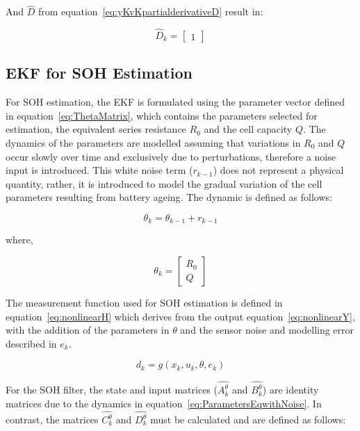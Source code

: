 And $\hat{D}$ from equation~\eqref{eq:yKvKpartialderivativeD} result in:

\begin{equation}
    \hat{D}_k = \begin{bmatrix}
    1
    \label{Dmatrix}
    \end{bmatrix}
\end{equation}

\subsection{EKF for SOH Estimation}\label{SOHEKF}
For \acs{SOH} estimation, the \acs{EKF} is formulated using the parameter vector defined in equation~\ref{eq:ThetaMatrix}, 
which contains the parameters selected for estimation, the equivalent series resistance $R_0$ and the cell capacity $Q$.
The dynamics of the parameters are modelled assuming that variations in $R_0$ and $Q$ occur slowly over time and exclusively due to 
perturbations, therefore a noise input is introduced. 
This white noise term ($r_{k-1}$) does not represent a physical quantity, rather, it is introduced to model the gradual 
variation of the cell parameters 
resulting from battery ageing. The dynamic is defined as follows:

\begin{equation}
    \theta_k = \theta_{k-1} + r_{k-1}
    \label{eq:ParametersEqwithNoise}
\end{equation}

where,

\begin{equation}
    \theta_k = \begin{bmatrix}
    R_0 \\
    Q
    \label{eq:ThetaMatrix}
    \end{bmatrix}
\end{equation}

The measurement function used for \acs{SOH} estimation is defined in equation~\ref{eq:nonlinearH} which derives from 
the output equation~\ref{eq:nonlinearY}, with the addition of the parameters in $\theta$ and the sensor noise and modelling error 
described in $e_k$.

\begin{equation}
    d_k = g(x_k, u_k, \theta, e_k)
    \label{eq:nonlinearH}
\end{equation}

For the \acs{SOH} filter, the state and input matrices ($\hat{A_k^\theta}$ and $\hat{B_k^\theta}$) are identity matrices due 
to the dynamics in equation~\ref{eq:ParametersEqwithNoise}. In contrast, the matrices $\hat{C_k^\theta}$ and $\hat{D_k^\theta}$ must be
calculated and are defined as follows:

